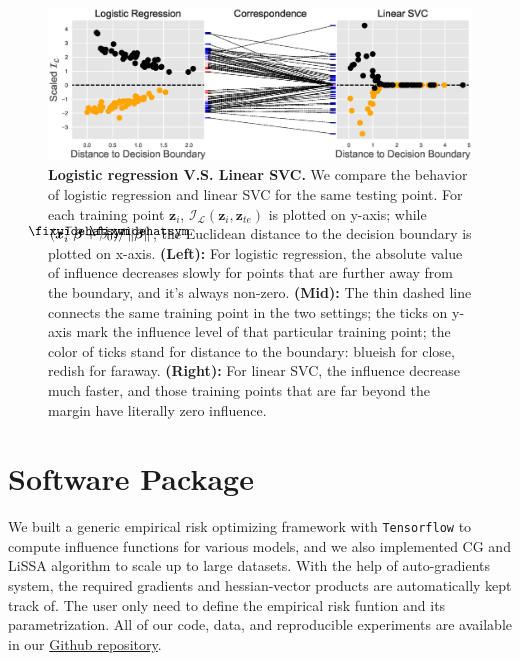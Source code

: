 \documentclass{article}
\newcommand\lowerwidehatsym{%
  \text{\smash{\raisebox{-1.3ex}{%
    $\fixwidehatsym$}}}}
\newcommand\fixwidehat[1]{%
  \mathchoice
    {\accentset{\displaystyle\lowerwidehatsym}{#1}}
    {\accentset{\textstyle\lowerwidehatsym}{#1}}
    {\accentset{\scriptstyle\lowerwidehatsym}{#1}}
    {\accentset{\scriptscriptstyle\lowerwidehatsym}{#1}}
}
\begin{document}
\setcounter{figure}{4}
\begin{figure}[h]
\vskip 0.0in
\begin{center}
\centerline{\includegraphics[width=\columnwidth]{fig-app1}}
\vskip -0.1in
\caption{\textbf{Logistic regression V.S. Linear SVC.} We compare the behavior of logistic regression and linear SVC for the same testing point. For each training point $\bm{z}_{i}$, $\mathcal{I}_{\mathcal{L}}(\bm{z}_{i}, \bm{z}_{te})$ is plotted on y-axis; while $ (\bm{x}_{i}^{\top}\fixwidehat{\bm{\beta}}+\beta_0) / \left\lVert \fixwidehat{\bm{\beta}}\right\rVert$, the Euclidean distance to the decision boundary is plotted on x-axis. \textbf{(Left):} For logistic regression, the absolute value of influence decreases slowly for points that are further away from the boundary, and it's always non-zero. \textbf{(Mid):} The thin dashed line connects the same training point in the two settings; the ticks on y-axis mark the influence level of that particular training point; the color of ticks stand for distance to the boundary: blueish for close, redish for faraway. \textbf{(Right):} For linear SVC, the influence decrease much faster, and those training points that are far beyond the margin have literally zero influence.} 
\label{model_behav_fig}
\end{center}
\vskip 0in
\end{figure}


\section{Software Package}
We built a generic empirical risk optimizing framework with \texttt{Tensorflow} to compute influence functions for various models, and we also implemented CG and LiSSA algorithm to scale up to large datasets. With the help of auto-gradients system, the required gradients and hessian-vector products are automatically kept track of. The user only need to define the empirical risk funtion and its parametrization. All of our code, data, and reproducible experiments are available in our \href{https://github.com/zedyang/46927-Project}{Github repository}.





\end{document}
